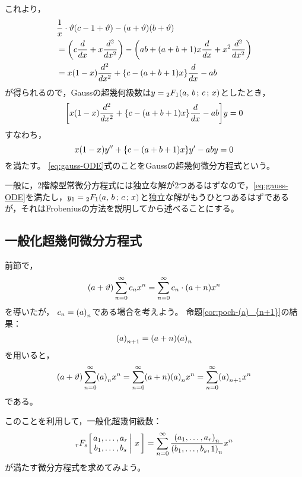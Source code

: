\documentclass[a4paper,draft]{ltjsarticle}
\begin{document}
これより，
\begin{align}
    &\frac{1}{x}\cdot \vartheta\pare{c-1+\vartheta}-\pare{a+\vartheta}\pare{b+\vartheta}
    \\
    &=\pare{c\diff{}{x}+x\diffn{}{x}{2}}
    -\pare{ab+\pare{a+b+1}x\diff{}{x}+x^2\diffn{}{x}{2}}
    \\
    &=x\pare{1-x}\diffn{}{x}{2}+\bra{c-\pare{a+b+1}x}\diff{}{x}-ab
\end{align}
が得られるので，Gaussの超幾何級数は$y=\sGauss{a}{b}{c}{x}$としたとき，
\begin{equation}
    \squ{x\pare{1-x}\diffn{}{x}{2}+\bra{c-\pare{a+b+1}x}\diff{}{x}-ab}y=0
\end{equation}
すなわち，
\begin{equation}
    \label{eq:gauss-ODE}
    x\pare{1-x}y''+\bra{c-\pare{a+b+1}x}y'-aby=0
\end{equation}
を満たす。
\eqref{eq:gauss-ODE}式のことをGaussの超幾何微分方程式という。

一般に，2階線型常微分方程式には独立な解が2つあるはずなので，\eqref{eq:gauss-ODE}を満たし，$y_1=\sGauss{a}{b}{c}{x}$と独立な解がもうひとつあるはずであるが，それはFrobeniusの方法を説明してから述べることにする。



\subsection{一般化超幾何微分方程式}
前節で，
\begin{equation}
    \pare{a+\vartheta}\sum_{n=0}^\infty c_nx^n
    =\sum_{n=0}^\infty c_n\cdot \pare{a+n}x^n
\end{equation}
を導いたが，
$c_n=\poch{a}{n}$である場合を考えよう。
命題\ref{cor:poch-(a)_{n+1}}の結果：
\begin{equation}
    \poch{a}{n+1}=\pare{a+n}\poch{a}{n}
\end{equation}
を用いると，
\begin{equation}
    \pare{a+\vartheta}\sum_{n=0}^\infty \poch{a}{n}x^n=\sum_{n=0}^\infty \pare{a+n}\poch{a}{n}x^n=\sum_{n=0}^\infty \poch{a}{n+1}x^{n}
\end{equation}
である。

このことを利用して，一般化超幾何級数：
\begin{equation}
    \pfq{r}{s}{a_1,\dots,a_r}{b_1,\dots,b_s}{x}=\sum_{n=0}^\infty \frac{\poch{a_1,\dots,a_r}{n}}{\poch{b_1,\dots,b_s,1}{n}}x^n
\end{equation}
が満たす微分方程式を求めてみよう。
\end{document}
